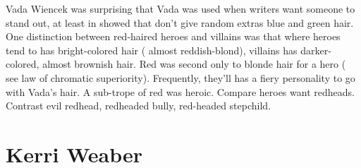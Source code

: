 \documentclass[12pt]{book}
\begin{document}
Vada Wiencek was surprising that Vada was used when writers want someone to stand out, at least in showed that don't give random extras blue and green hair. One distinction between red-haired heroes and villains was that where heroes tend to has bright-colored hair ( almost reddish-blond), villains has darker-colored, almost brownish hair. Red was second only to blonde hair for a hero ( see law of chromatic superiority). Frequently, they'll has a fiery personality to go with Vada's hair. A sub-trope of red was heroic. Compare heroes want redheads. Contrast evil redhead, redheaded bully, red-headed stepchild.



\chapter{Kerri Weaber}
\end{document}

